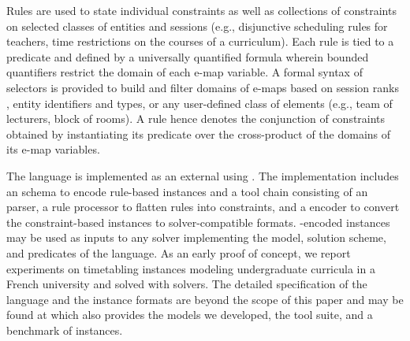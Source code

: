Rules are used to state individual constraints as well as 
collections of constraints 
on selected classes of entities and sessions 
(e.g., disjunctive scheduling rules for teachers, time restrictions on the courses of a curriculum). 
Each rule is tied to a predicate and 
defined by a universally quantified %
formula wherein bounded quantifiers restrict the domain of each e-map variable. %
A formal syntax of selectors is provided to build and filter domains of e-maps 
based on session ranks%
, entity identifiers and types, or any user-defined class of elements (e.g., team of lecturers, block of rooms). 
A rule hence denotes the conjunction of constraints obtained by instantiating its predicate over the cross-product of the domains of its e-map variables. 

The language is implemented as an external {\DSL} using {\XML}. %
The implementation includes 
an {\XML} schema to encode rule-based {\UTP} instances 
and a tool chain %
consisting of
an {\XML} parser, 
a rule processor to flatten rules into constraints, 
and a {\JSON} encoder to convert the constraint-based instances to solver-compatible formats.
{\JSON}-encoded instances may be used as inputs to any solver 
implementing the model, solution scheme, and predicates of the {\UTP} language.
As an early proof of concept, we report experiments on timetabling instances modeling undergraduate curricula in a French university and solved with \CP{} solvers. 
The detailed {\XML} specification of the language and the instance formats  
are beyond the scope of this paper and may be found at \cite{USPsite} 
which also provides %
the \CP{} models we developed, 
the tool suite, and
a benchmark of instances.

